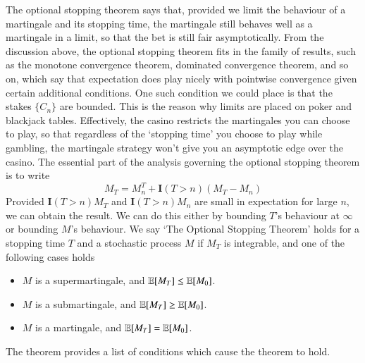 The optional stopping theorem says that, provided we limit the behaviour of a martingale and its stopping time, the martingale still behaves well as a martingale in a limit, so that the bet is still fair asymptotically. From the discussion above, the optional stopping theorem fits in the family of results, such as the monotone convergence theorem, dominated convergence theorem, and so on, which say that expectation does play nicely with pointwise convergence given certain additional conditions. One such condition we could place is that the stakes $\{ C_n \}$ are bounded. This is the reason why limits are placed on poker and blackjack tables. Effectively, the casino restricts the martingales you can choose to play, so that regardless of the `stopping time' you choose to play while gambling, the martingale strategy won't give you an asymptotic edge over the casino. The essential part of the analysis governing the optional stopping theorem is to write
%
\[ M_T = M^T_n + \mathbf{I}(T > n) (M_T - M_n) \]
%
Provided $\mathbf{I}(T > n) M_T$ and $\mathbf{I}(T > n) M_n$ are small in expectation for large $n$, we can obtain the result. We can do this either by bounding $T$'s behaviour at $\infty$ or bounding $M$'s behaviour. We say `The Optional Stopping Theorem' holds for a stopping time $T$ and a stochastic process $M$ if $M_T$ is integrable, and one of the following cases holds
%
\begin{itemize}
    \item $M$ is a supermartingale, and $\operatorname{\mathbb{E}}[M_T] \leq \operatorname{\mathbb{E}}[M_0]$.
    \item $M$ is a submartingale, and $\operatorname{\mathbb{E}}[M_T] \geq \operatorname{\mathbb{E}}[M_0]$.
    \item $M$ is a martingale, and $\operatorname{\mathbb{E}}[M_T] = \operatorname{\mathbb{E}}[M_0]$.
\end{itemize}
%
The theorem provides a list of conditions which cause the theorem to hold.

